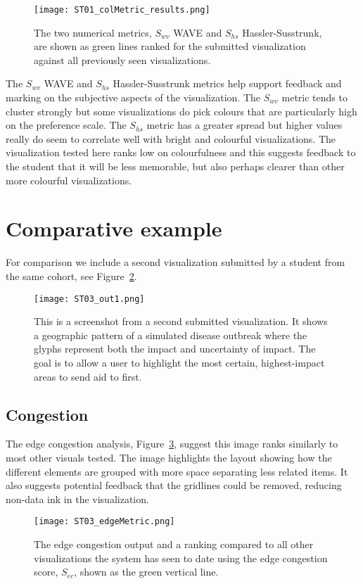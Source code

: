 \begin{figure}[htb]
  \centering
  \texttt{[image: ST01\_colMetric\_results.png]}
  \caption{\label{fig:colMetricResults}
           The two numerical metrics, $S_{wv}$ WAVE and $S_{hs}$ Hassler-Susstrunk, are shown as green lines ranked for the submitted visualization against all previously seen visualizations.}
\end{figure}

The $S_{wv}$ WAVE and $S_{hs}$ Hassler-Susstrunk metrics help support feedback and marking on the subjective aspects of the visualization. The $S_{wv}$ metric tends to cluster strongly but some visualizations do pick colours that are particularly high on the preference scale. The $S_{hs}$ metric has a greater spread but higher values really do seem to correlate well with bright and colourful visualizations. The visualization tested here ranks low on colourfulness and this suggests feedback to the student that it will be less memorable, but also perhaps clearer than other more colourful visualizations.

\section{Comparative example}
For comparison we include a second visualization submitted by a student from the same cohort, see Figure~\ref{fig:output03}.
\begin{figure}[htb]
  \centering
  \texttt{[image: ST03\_out1.png]}
  \caption{\label{fig:output03}
           This is a screenshot from a second submitted visualization. It shows a geographic pattern of a simulated disease outbreak where the glyphs represent both the impact and uncertainty of impact. The goal is to allow a user to highlight the most certain, highest-impact areas to send aid to first.}
\end{figure}

\subsection{Congestion}
The edge congestion analysis, Figure~\ref{fig:ST03edgeResults}, suggest this image ranks similarly to most other visuals tested. The image highlights the layout showing how the different elements are grouped with more space separating less related items. It also suggests potential feedback that the gridlines could be removed, reducing non-data ink in the visualization.

\begin{figure}[htb]
  \centering
  \texttt{[image: ST03\_edgeMetric.png]}
  \caption{\label{fig:ST03edgeResults}
           The edge congestion output and a ranking compared to all other visualizations the system has seen to date using the edge congestion score, $S_{ec}$, shown as the green vertical line.}
\end{figure}

